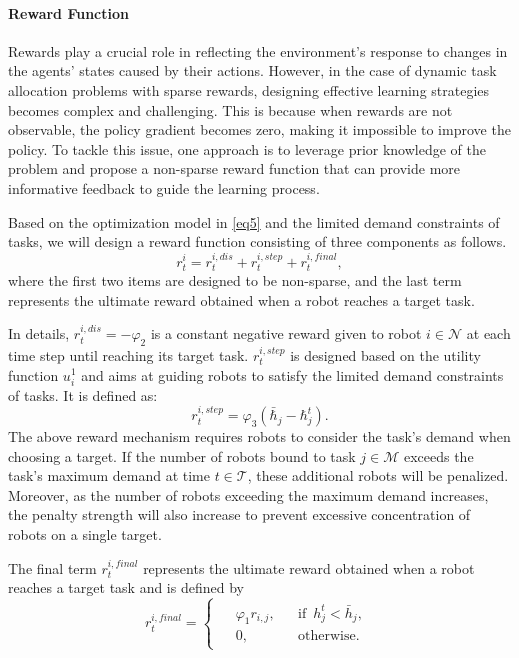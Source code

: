 \documentclass[lettersize,journal]{IEEEtran}
\begin{document}
\paragraph{\textbf{Reward Function}} Rewards play a crucial role in reflecting the environment's response to changes in the agents' states caused by their actions. However, in the case of dynamic task allocation problems with sparse rewards, designing effective learning strategies becomes complex and challenging. This is because when rewards are not observable, the policy gradient becomes zero, making it impossible to improve the policy. To tackle this issue, one approach is to leverage prior knowledge of the problem and propose a non-sparse reward function  that can provide more informative feedback to guide the learning process.

Based on the optimization model in \eqref{eq5} and the limited demand constraints of tasks, we will design  a reward function consisting of three components as follows.
\begin{equation}
    r_t^i=r_t^{i,dis}+r_t^{i,step}+r_t^{i,final},\label{eq7}
\end{equation}
where  the first two items are designed to be non-sparse, and the last term represents the ultimate reward obtained when a robot reaches a target task.


 In details, $r_{t}^{i,dis}=-\varphi_{2}$ is a constant negative reward given to robot  $i\in \mathcal{N}$ at each time step until  reaching its target task. $r_t^{i,step}$ is designed based on the utility function $u_i^1$ and aims at guiding robots to satisfy the limited demand constraints of tasks. It is defined as: 
\begin{equation}
    r_t^{i,step}=\varphi_3\left(\bar{\hbar}_j-\hbar_j^t\right).\label{eq8}
\end{equation}
The above reward mechanism requires robots to consider the task's demand when choosing a target. If the number of robots bound to task $j\in\mathcal{M}$ exceeds the task's maximum demand at time $t\in\mathcal{T}$, these additional robots will be penalized. Moreover, as the number of robots exceeding the maximum demand increases, the penalty strength will also  increase to prevent excessive concentration of robots on a single target. 

The final term $r_t^{i,final}$ represents the ultimate reward obtained when a robot reaches a target task and is defined by
\begin{equation}
r^{i,final}_t=
\begin{cases}
    \begin{aligned}
        & \varphi_1r_{i,j}, && \text{if}\enspace h_j^t<\bar{h}_j,\\
        & 0, &&\text{otherwise}.
    \end{aligned}
\end{cases}\label{eq9}
\end{equation}
\end{document}
